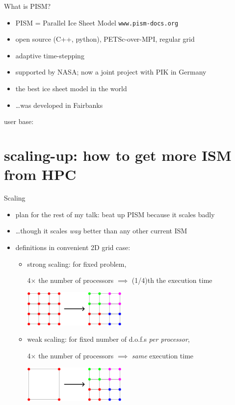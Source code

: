 \documentclass[intlimits]{beamer}
\begin{document}
\begin{frame}{What is PISM?}

\begin{itemize}
\item PISM = Parallel Ice Sheet Model \qquad \texttt{www.pism-docs.org}
\item open source (C++, python), PETSc-over-MPI, regular grid
\item adaptive time-stepping
\item supported by NASA; now a joint project with PIK in Germany
\item<1-> the best ice sheet model in the world
\item<2> \dots was developed in Fairbanks
\end{itemize}

\begin{center}
    user base: \quad %
\end{center}
\end{frame}


\section[scaling-up]{scaling-up: how to get more ISM from HPC}

\begin{frame}{Scaling}
\begin{itemize}
\item plan for the rest of my talk: beat up PISM because it scales badly
\item \dots though it scales \emph{way} better than any other current ISM
\item definitions in convenient 2D grid case:
  \begin{itemize}
  \item \alert{strong scaling}: for fixed problem, 
  
  \centerline{4$\times$ the number of processors $\implies$ (1/4)th the execution time}
    \begin{center}
    \includegraphics[height=1.8cm]{stronggrid}
    \end{center}
  \item \alert{weak scaling}: for fixed number of d.o.f.s \emph{per processor},
  
  \centerline{4$\times$ the number of processors $\implies$ \emph{same} execution time}
    \begin{center}
    \includegraphics[height=1.8cm]{weakgrid}
    \end{center}
  \end{itemize}
\end{itemize}
\end{frame}
\end{document}
